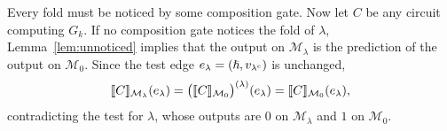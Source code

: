 Every fold must be noticed by some composition gate.
Now let $C$ be any circuit computing $G_k$.
If no composition gate notices the fold of
$\lambda$, Lemma~\ref{lem:unnoticed} implies that the output
on $\mathcal M_\lambda$ is the prediction
of the output on $\mathcal M_0$.
Since the test edge $e_\lambda=(\hslash,v_{\lambda^c})$ is unchanged,
\[
\llbracket C\rrbracket_{\mathcal M_\lambda}(e_\lambda)
=
\bigl(\llbracket C\rrbracket_{\mathcal M_0}
\bigr)^{(\lambda)}(e_\lambda)
=
\llbracket C\rrbracket_{\mathcal M_0}(e_\lambda),
\]
contradicting the test for $\lambda$, whose outputs are $0$ on $\mathcal M_{\lambda}$ and $1$ on $\mathcal M_0$.
\fi

